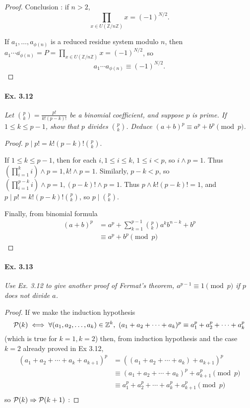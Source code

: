 \documentclass[11pt,a4paper]{article}
\newcommand{\Z}{\mathbb{Z}}
\begin{document}
{\begin{proof}
Conclusion : if $n>2$, $$\prod_{x \in U(\Z/n\Z)} x = (-1)^{N/2}.$$

If $a_1, \ldots, a_{\phi(n)}$ is a reduced residue system modulo $n$, then $\overline{ a_1 \cdots a_{\phi(n)}}  = P = \prod_{x \in U(\Z/n\Z)} x = (-1)^{N/2}$, so 
$$a_1 \cdots a_{\phi(n)} \equiv (-1)^{N/2}.$$
\end{proof}

\paragraph{Ex. 3.12}

{\it Let ${p \choose k} = \frac{p!}{k!(p-k)!}$ be a binomial coefficient, and suppose $p$ is prime. If $1 \leq k \leq p-1$, show that $p$ divides ${p \choose k}$. Deduce $(a+b)^p \equiv a^p + b^p \pmod p$.
}

\begin{proof}
$p \mid p! = k!(p-k)! {p \choose k}$.

If $1\leq k \leq p-1$, then for each $i, 1\leq i \leq k$, $1\leq i < p$, so $i\wedge p=1$. Thus $ \left(\prod_{i=1}^k i \right) \wedge p = 1, k!\wedge p = 1$. Similarly, $p-k<p$, so $\left( \prod_{i=1}^{p-k} i \right)\wedge p = 1, (p-k)!\wedge p = 1$. Thus $p \wedge k!(p-k)! = 1$, and $p \mid p! = k!(p-k)! {p \choose k}$, so $p \mid {p \choose k}$.

Finally, from binomial formula
\begin{align*}
(a+b)^p &= a^p + \sum_{k=1}^{p-1} {p \choose k} a^k b^{n-k} + b^p\\
&\equiv a^p + b^p \pmod p
\end{align*}
\end{proof}

\paragraph{Ex. 3.13}

{\it Use Ex. 3.12 to give another proof of Fermat's theorem, $a^{p-1} \equiv 1 \pmod p$ if $p$ does not divide $a$.
}

\begin{proof}
If we make the induction hypothesis 
$${\cal P}(k) \iff \forall (a_1,a_2,\ldots,a_k) \in \Z^k,\  (a_1+a_2+\cdots+a_k)^p \equiv a_1^p+a_2^p+\cdots+a_k^p$$
(which is true for $k=1,k=2$)
then, from induction hypothesis and the case $k=2$ already proved in Ex 3.12,
\begin{align*}
(a_1+a_2+\cdots+a_k+a_{k+1})^p &= ((a_1+a_2+\cdots+a_k) +a_{k+1})^p\\
&\equiv (a_1+a_2+\cdots+a_k)^p + a_{k+1}^p \pmod p\\
&\equiv a_1^p+a_2^p+\cdots+a_k^p+ a_{k+1}^p \pmod p\\
\end{align*}
so ${\cal P}(k) \Rightarrow {\cal P}(k+1)$ :


\end{proof}}
\end{document}
